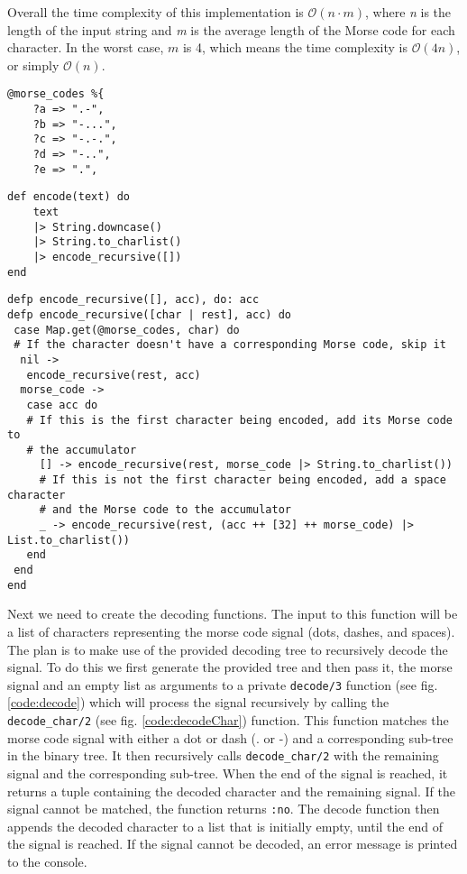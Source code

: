 \documentclass[a4paper,11pt]{article}
\newenvironment{code}{\captionsetup{type=listing}}{}
\begin{document}
Overall the time complexity of this implementation is $\mathcal{O}(n\cdot m)$, where \textit{n} is the length of the input string and 
\textit{m} is the average length of the Morse code for each character. In the worst case, $m$ is 4, which means the time complexity
is $\mathcal{O}(4n)$, or simply $\mathcal{O}(n)$.

\begin{code}
\label{code:morseMap}
\begin{verbatim}
@morse_codes %{
    ?a => ".-",
    ?b => "-...",
    ?c => "-.-.",
    ?d => "-..",
    ?e => ".",
\end{verbatim}
\end{code}
\begin{code}
\label{code:encode}
\begin{verbatim}
def encode(text) do
    text
    |> String.downcase()
    |> String.to_charlist()
    |> encode_recursive([])
end
\end{verbatim}
\end{code}
\begin{code}
\label{code:encode_recursive}
\begin{verbatim}
defp encode_recursive([], acc), do: acc
defp encode_recursive([char | rest], acc) do
 case Map.get(@morse_codes, char) do
 # If the character doesn't have a corresponding Morse code, skip it
  nil ->
   encode_recursive(rest, acc)
  morse_code ->
   case acc do
   # If this is the first character being encoded, add its Morse code to 
   # the accumulator
     [] -> encode_recursive(rest, morse_code |> String.to_charlist())
     # If this is not the first character being encoded, add a space character 
     # and the Morse code to the accumulator
     _ -> encode_recursive(rest, (acc ++ [32] ++ morse_code) |> List.to_charlist())
   end
 end
end
\end{verbatim}
\end{code}

Next we need to create the decoding functions. The input to this function will be a list of characters representing the morse code 
signal (dots, dashes, and spaces). The plan is to make use of the provided decoding tree to recursively decode the signal. To do this 
we first generate the provided tree and then pass it, the morse signal and an empty list as arguments to a private 
{\tt decode/3} function (see fig. \ref{code:decode}) which will process the signal recursively by calling the {\tt decode\_char/2} 
(see fig. \ref{code:decodeChar}) function. This function 
matches the morse code signal with either a dot or dash (. or -) and a corresponding sub-tree in the binary tree. It then 
recursively calls {\tt decode\_char/2} with the remaining signal and the corresponding sub-tree. When the end of the signal is reached,
it returns a tuple containing the decoded character and the remaining signal. If the signal cannot be matched, the function returns 
{\tt :no}.
The decode function then appends the decoded character to a list that is initially empty, until the end of the signal is reached. 
If the signal cannot be decoded, an error message is printed to the console.
\end{document}
